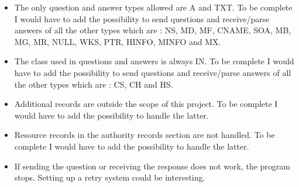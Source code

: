 \documentclass[a4paper, 11pt]{article}
\begin{document}
\begin{itemize}
    \item The only question and answer types allowed are A and TXT. To be complete I would have to add the possibility to send questions and receive/parse answers of all the other types which are : NS, MD, MF, CNAME, SOA, MB, MG, MR, NULL, WKS, PTR, HINFO, MINFO and MX.
    
    \item The class used in questions and answers is always IN. To be complete I would have to add the possibility to send questions and receive/parse answers of all the other types which are : CS, CH and HS.

    \item Additional records are outside the scope of this project. To be complete I would have to add the possibility to handle the latter.

    \item Resource records in the authority records section are not handled. To be complete I would have to add the possibility to handle the latter.

    \item If sending the question or receiving the response does not work, the program stops. Setting up a retry system could be interesting.
    
\end{itemize}
\end{document}
